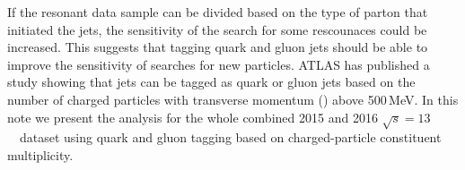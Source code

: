 If the resonant data sample can be divided based on the type of
parton that initiated the jets, the sensitivity of the search for some
rescounaces could be increased. 
This suggests that tagging quark and gluon jets should be able to
improve the sensitivity of searches for new particles.
ATLAS has published a study \cite{ATL-PHYS-PUB-2017-009} showing that
jets can be tagged as quark or gluon jets based on the number of
charged particles with transverse momentum (\pt ) above 500\,MeV.  
In this note we present the analysis for the whole combined 2015 and
2016 $\sqrt{s} = 13$~\TeV\ dataset using quark and gluon tagging
based on charged-particle constituent multiplicity. 







